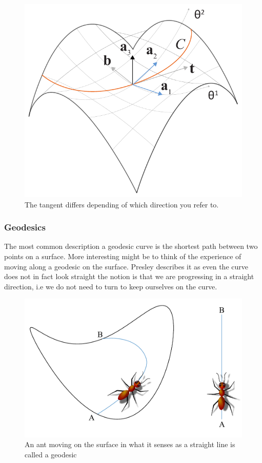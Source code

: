 \begin{figure}[H]
\centering
\includegraphics[width=0.7\linewidth ]{figure/Theory/CurveOnSurface.pdf}
\caption{The tangent differs depending of which direction you refer to. }
\end{figure}



\subsubsection{Geodesics} \label{sec:geodesics}

The most common description a geodesic curve is the shortest path between two points on a surface. More interesting might be to think of the experience of moving along a geodesic on the surface. Presley describes it as even the curve does not in fact look straight the notion is that we are progressing in a straight direction, i.e we do not need to turn to keep ourselves on the curve. 


\begin{figure}[H]
\centering
\includegraphics[width=0.7\linewidth ]{figure/Theory/Geodesics.pdf}
\caption{An ant moving on the surface in what it senses as a straight line is called a geodesic }
\end{figure}

